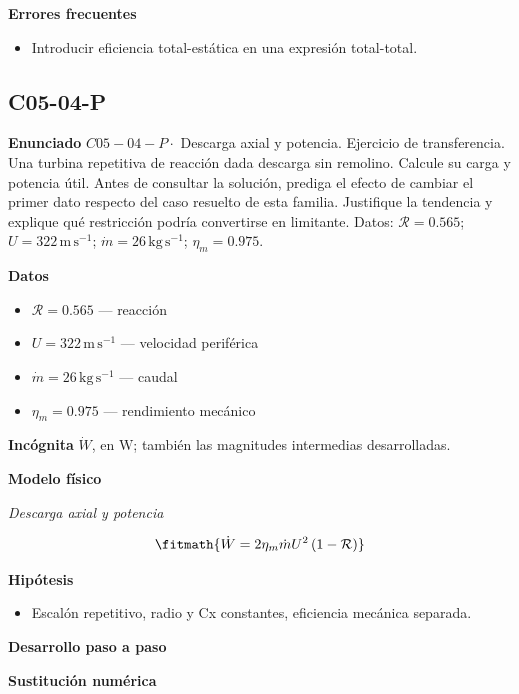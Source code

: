 \documentclass[10pt,openany]{book}
\begin{document}
\noindent\textbf{Errores frecuentes}
\begin{itemize}
\item Introducir eficiencia total-estática en una expresión total-total.
\end{itemize}
\subsection*{C05-04-P}

\noindent\textbf{Enunciado}
\(C05-04-P \cdot\) Descarga axial y potencia. Ejercicio de transferencia. Una turbina repetitiva de reacción dada descarga sin remolino. Calcule su carga y potencia útil. Antes de consultar la solución, prediga el efecto de cambiar el primer dato respecto del caso resuelto de esta familia. Justifique la tendencia y explique qué restricción podría convertirse en limitante. Datos: \(\mathcal R=0.565\); \(U=322\, \mathrm{m}\,\mathrm{s}^{-1}\); \(\dot m=26\, \mathrm{kg}\,\mathrm{s}^{-1}\); \(\eta_m=0.975\).

\noindent\textbf{Datos}
\begin{itemize}
\item $\mathcal R = 0.565$ — reacción
\item $U = 322\,\mathrm{m}\,\mathrm{s}^{-1}$ — velocidad periférica
\item $\dot m = 26\,\mathrm{kg}\,\mathrm{s}^{-1}$ — caudal
\item $\eta_m = 0.975$ — rendimiento mecánico
\end{itemize}

\noindent\textbf{Incógnita}
$\dot{W}$, en $\mathrm{W}$; también las magnitudes intermedias desarrolladas.

\noindent\textbf{Modelo físico}

\noindent\textit{Descarga axial y potencia}

\[
\fitmath{\dot{W}=2 \eta_m \dot m U^{2} \left(1 - \mathcal R\right)}
\]

\noindent\textbf{Hipótesis}
\begin{itemize}
\item Escalón repetitivo, radio y Cx constantes, eficiencia mecánica separada.
\end{itemize}

\noindent\textbf{Desarrollo paso a paso}



\noindent\textbf{Sustitución numérica}
\end{document}
